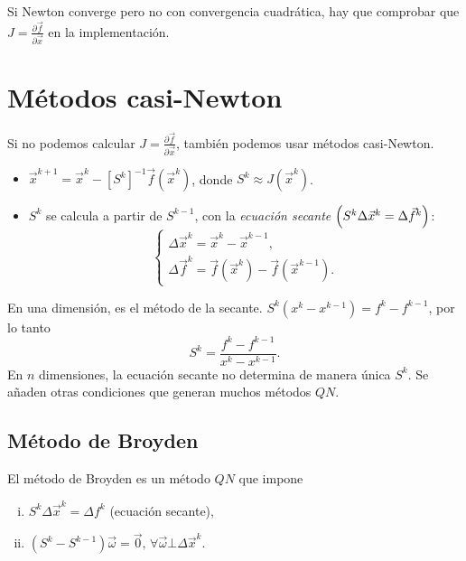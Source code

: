 \begin{obs}
    Si Newton converge pero no con convergencia cuadr\'atica, hay que comprobar que $J = \frac{\partial\vec{f}}{\partial\vec{x}}$ en la implementaci\'on.
\end{obs}

\section{M\'etodos casi-Newton}

\noindent Si no podemos calcular $J = \frac{\partial \vec{f}}{\partial \vec{x}}$, también podemos usar métodos casi-Newton.

\begin{itemize}
    \item $\vec{x}^{k+1} = \vec{x}^k - \left[ S^k \right]^{-1} \vec{f}\left( \vec{x}^k \right)$, donde $S^k \approx J\left( \vec{x}^k \right)$.
    \item $S^k$ se calcula a partir de $S^{k-1}$, con la \emph{ecuaci\'on secante} $\left( S^k\Delta\vec{x}^k = \Delta \vec{f}^k\right)$:
        \[
            \begin{cases}
                \Delta\vec{x}^k = \vec{x}^k - \vec{x}^{k-1}, \\
                \Delta\vec{f}^k = \vec{f}\left( \vec{x}^k \right) - \vec{f}\left( \vec{x}^{k-1} \right).
            \end{cases}
        \]
\end{itemize}

\begin{obs}
    En una dimensi\'on, es el m\'etodo de la secante. $S^k\left( x^k - x^{k-1} \right) = f^k - f^{k-1}$, por lo tanto
    \[
        S^k = \frac{f^k - f^{k-1}}{x^k - x^{k-1}}.
    \]
    En $n$ dimensiones, la ecuaci\'on secante no determina de manera \'unica $S^k$. Se añaden otras condiciones que generan muchos m\'etodos $QN$.
\end{obs}

\subsection{M\'etodo de Broyden}

\noindent El m\'etodo de Broyden es un m\'etodo $QN$ que impone
\begin{enumerate}[i)]
    \item\label{item:broyden1} $S^k\Delta\vec{x}^k = \Delta f^k$ (ecuaci\'on secante),
    \item\label{item:broyden2} $\left( S^k - S^{k-1} \right)\vec{\omega} = \vec{0}, \, \forall \vec{\omega} \bot \Delta \vec{x}^k$.
\end{enumerate}

